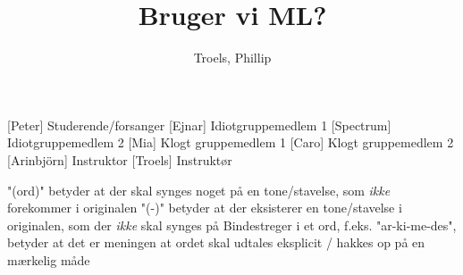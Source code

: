 \documentclass[a4paper,11pt]{article}
\title{Bruger vi ML?}
\author{Troels, Phillip}
\begin{document}
\maketitle

\begin{roles}
  [Peter] Studerende/forsanger
  [Ejnar] Idiotgruppemedlem 1
  [Spectrum] Idiotgruppemedlem 2
  [Mia] Klogt gruppemedlem 1
  [Caro] Klogt gruppemedlem 2
  [Arinbjörn] Instruktor
  [Troels] Instruktør
\end{roles}

\begin{props}
\end{props}

"(ord)" betyder at der skal synges noget på en tone/stavelse, som
\textit{ikke} forekommer i originalen "(-)" betyder at der
eksisterer en tone/stavelse i originalen, som der \textit{ikke} skal
synges på Bindestreger i et ord, f.eks. "ar-ki-me-des", betyder at
det er meningen at ordet skal udtales eksplicit / hakkes op på en
mærkelig måde
\end{document}
